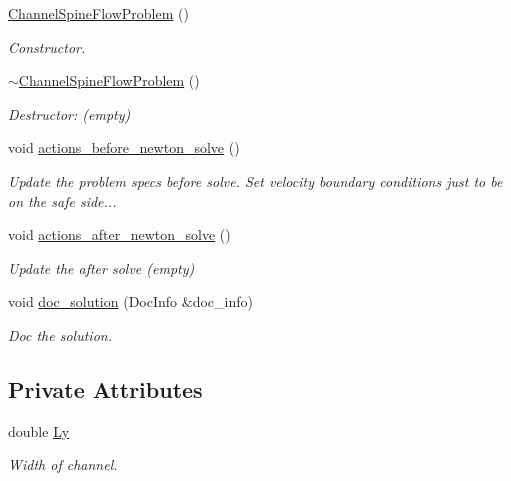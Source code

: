 \begin{DoxyCompactItemize}
\hyperlink{classChannelSpineFlowProblem_a23f1b987e3395b1d101eaf3f3b5c94b2}{Channel\+Spine\+Flow\+Problem} ()
\begin{DoxyCompactList}\small\item\em Constructor. \end{DoxyCompactList}\item 
\hyperlink{classChannelSpineFlowProblem_abdf2cc520915167d8718499459df348b}{$\sim$\+Channel\+Spine\+Flow\+Problem} ()
\begin{DoxyCompactList}\small\item\em Destructor\+: (empty) \end{DoxyCompactList}\item 
void \hyperlink{classChannelSpineFlowProblem_aaf6dd8a8a472ccd938df579aba61ec97}{actions\+\_\+before\+\_\+newton\+\_\+solve} ()
\begin{DoxyCompactList}\small\item\em Update the problem specs before solve. Set velocity boundary conditions just to be on the safe side... \end{DoxyCompactList}\item 
void \hyperlink{classChannelSpineFlowProblem_a419a80ef3d19438f193bd7843f72446a}{actions\+\_\+after\+\_\+newton\+\_\+solve} ()
\begin{DoxyCompactList}\small\item\em Update the after solve (empty) \end{DoxyCompactList}\item 
void \hyperlink{classChannelSpineFlowProblem_a101bdeee56502231945cbac272ca21f6}{doc\+\_\+solution} (Doc\+Info \&doc\+\_\+info)
\begin{DoxyCompactList}\small\item\em Doc the solution. \end{DoxyCompactList}\end{DoxyCompactItemize}
\subsection*{Private Attributes}
\begin{DoxyCompactItemize}
\item 
double \hyperlink{classChannelSpineFlowProblem_a6ac51c3c9d400869e694fe00452e293f}{Ly}
\begin{DoxyCompactList}\small\item\em Width of channel. \end{DoxyCompactList}\end{DoxyCompactItemize}


